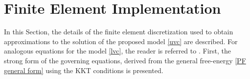 \section{Finite Element Implementation}
\label{sec:fem_implementation}

In this Section, the details of the finite element discretization used to obtain approximations to the solution of the proposed model \eqref{uvc} are described. For analogous equations for the model \eqref{lvc}, the reader is referred to \cite{jiang2022phase}.
First, the strong form of the governing equations, derived from the general free-energy \eqref{PF general form} using the KKT\cite{karush1939minima, kuhn1951nonlinear} conditions is presented.


